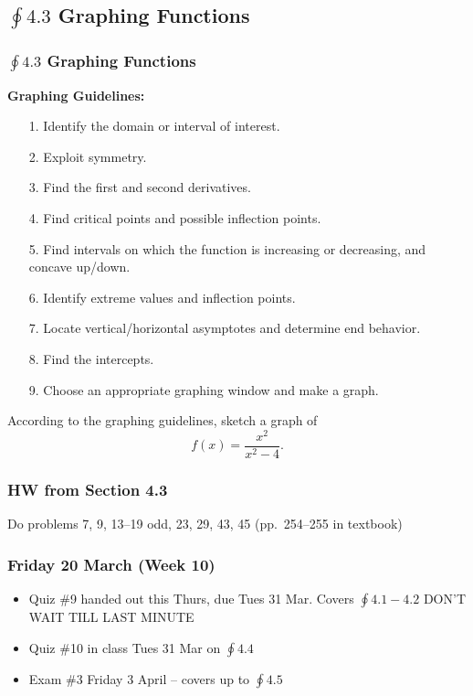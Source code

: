 \documentclass[14pt]{beamer}
\begin{document}
\begin{frame}
\subsection[$\oint 4.3$ Graphing Functions]{$\oint 4.3$ Graphing Functions}
\frametitle{$\oint 4.3$ Graphing Functions}
\footnotesize
{\bf Graphing Guidelines:}
\begin{itemize}
\item[1.] Identify the domain or interval of interest.
\item[2.] Exploit symmetry.
\item[3.] Find the first and second derivatives.
\item[4.] Find critical points and possible inflection points.
\item[5.] Find intervals on which the function is increasing or decreasing, and concave up/down.
\item[6.] Identify extreme values and inflection points.
\item[7.] Locate vertical/horizontal asymptotes and determine end behavior.
\item[8.] Find the intercepts.
\item[9.] Choose an appropriate graphing window and make a graph.
\end{itemize}
\end{frame}

\begin{frame}
\begin{exe} According to the graphing guidelines, sketch a graph of 
\[f(x)=\frac{x^2}{x^2-4}.\]
\end{exe}
\end{frame}

\begin{frame}
\frametitle{HW from Section 4.3}
Do problems 7, 9, 13--19 odd, 23, 29, 43, 45 (pp.\ 254--255 in textbook)
\end{frame}


\begin{frame}
\frametitle{Friday 20 March (Week 10)}
\small
\begin{itemize}
\item Quiz \#9 handed out this Thurs, due Tues 31 Mar.  Covers $\oint 4.1-4.2$ DON'T WAIT TILL LAST MINUTE
\item Quiz \#10 in class Tues 31 Mar on $\oint 4.4$
\item Exam \#3 Friday 3 April -- covers up to $\oint 4.5$
\end{itemize}
\end{frame}
\end{document}

